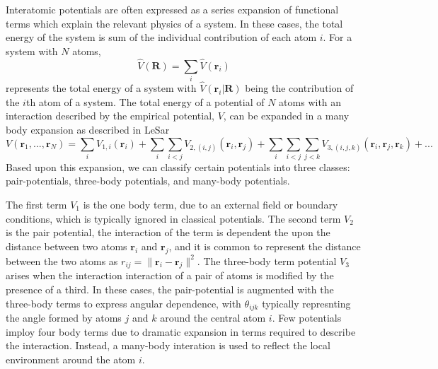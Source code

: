 Interatomic potentials are often expressed as a series expansion of functional terms which explain the relevant physics of a system.  In these cases, the total energy of the system is sum of the individual contribution of each atom $i$.  For a system with $N$ atoms,
\begin{equation}
	\label{eq:potential_energy}
	\hat{V}(\bm{R})= \sum_{i} \hat{V}(\bm{r}_i)
\end{equation}
represents the total energy of a system with $\hat{V}(\bm{r}_i \vert \bm{R})$ being the contribution of the $i$th atom of  a system.
The total energy of a potential of $N$ atoms with an interaction described by the empirical potential, $V$, can be expanded in a many body expansion as described in LeSar\cite{lesar2013_textbook}
\begin{equation}
	\label{eq:potential_expansion}
	V(\bm{r}_1,...,\bm{r}_N) =
	        \sum_i
							V_{1,i} (\bm{r}_i)
	        + \sum_i \sum_{i<j}
							V_{2,(i,j)}(\bm{r}_i,\bm{r}_j)
				  + \sum_i \sum_{i<j} \sum_{j<k} V_{3,(i,j,k)}(\bm{r}_i,\bm{r}_j,\bm{r}_k)
					+ ...
\end{equation}
Based upon this expansion, we can classify certain potentials into three classes: pair-potentials, three-body potentials, and many-body potentials.

The first term $V_1$ is the one body term, due to an external field or boundary conditions, which is typically ignored in classical potentials.  The second term $V_2$ is the pair potential, the interaction of the term is dependent the upon the distance between two atoms $\bm{r}_i$ and $\bm{r}_j$, and it is common to represent the distance between the two atoms as $r_{ij}=\lVert \bm{r}_i - \bm{r}_j \rVert^2$.  The three-body term potential $V_3$ arises when the interaction interaction of a pair of atoms is modified by the presence of a third.  In these cases, the pair-potential is augmented with the three-body terms to express angular dependence, with $\theta_{ijk}$ typically represnting the angle formed by atoms $j$ and $k$ around the central atom $i$.  Few potentials imploy four body terms due to dramatic expansion in terms required to describe the interaction.  Instead, a many-body interation is used to reflect the local environment around the atom $i$.

